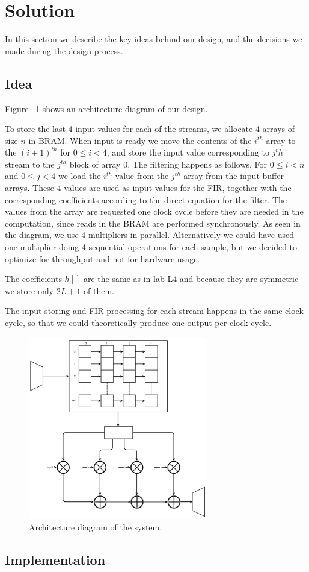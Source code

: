 \section{Solution}
In this section we describe the key ideas behind our design, and the decisions we made during the design process.
\subsection{Idea}

Figure ~\ref{fig:architecture} shows an architecture diagram of our design.

To store the last 4 input values for each of the streams,  we allocate 4 arrays of size $n$ in BRAM. When input is ready we move the contents of the $i^{th}$ array to the $(i+1)^{th}$ for $0 \leq i < 4$, and store the input value corresponding to $j{^th}$ stream to the $j^{th}$ block of array 0. The filtering happens as follows. For $0 \leq  i < n$ and $0 \leq j < 4$ we load the $i^{th}$ value from the $j^{th}$ array from the input buffer arrays.  These 4 values are used as input values for the FIR, together with the corresponding coefficients according to the direct equation for the filter. The values from the array are requested one clock cycle before they are needed in the computation, since reads in the BRAM are performed synchronously. As seen in the diagram, we use 4 multipliers in parallel. Alternatively we could have used one multiplier doing 4 sequential operations for each sample, but we decided to optimize for throughput and not for hardware usage.

The coefficients $h[]$ are the same as in lab L4 and because they are symmetric we store only $2L+1$ of them.

The input storing and FIR processing for each stream happens in the same clock cycle, so that we could theoretically produce one output per clock cycle.
\begin{figure}
\begin{center}
\includegraphics[width=0.7\textwidth]{images/architecture.png}
\caption{Architecture diagram of the system.}
\label{fig:architecture}
\end{center}
\end{figure}

\subsection{Implementation}
